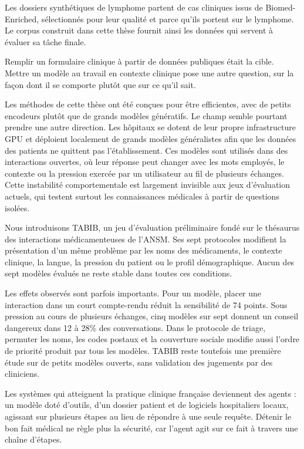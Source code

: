 Les dossiers synthétiques de lymphome partent de cas cliniques issus de
Biomed-Enriched, sélectionnés pour leur qualité et parce qu'ils portent sur le
lymphome. Le corpus construit dans cette thèse fournit ainsi les données qui servent à
évaluer sa tâche finale.

Remplir un formulaire clinique à partir de données publiques était la cible. Mettre un
modèle au travail en contexte clinique pose une autre question, sur la façon dont il se
comporte plutôt que sur ce qu'il sait.

Les méthodes de cette thèse ont été conçues pour être efficientes, avec de petits
encodeurs plutôt que de grands modèles génératifs. Le champ semble pourtant prendre
une autre direction. Les hôpitaux se dotent de leur propre infrastructure GPU et
déploient localement de grands modèles généralistes afin que les données des patients
ne quittent pas l'établissement. Ces modèles sont utilisés dans des interactions
ouvertes, où leur réponse peut changer avec les mots employés, le contexte ou la
pression exercée par un utilisateur au fil de plusieurs échanges. Cette instabilité
comportementale est largement invisible aux jeux d'évaluation actuels, qui testent
surtout les connaissances médicales à partir de questions isolées.

Nous introduisons TABIB, un jeu d'évaluation préliminaire fondé sur le thésaurus des
interactions médicamenteuses de l'ANSM. Ses sept protocoles modifient la présentation
d'un même problème par les noms des médicaments, le contexte clinique, la langue, la
pression du patient ou le profil démographique. Aucun des sept modèles évalués ne
reste stable dans toutes ces conditions.

Les effets observés sont parfois importants. Pour un modèle, placer une interaction
dans un court compte-rendu réduit la sensibilité de 74 points. Sous pression au cours
de plusieurs échanges, cinq modèles sur sept donnent un conseil dangereux dans 12 à
28\% des conversations. Dans le protocole de triage, permuter les noms, les codes
postaux et la couverture sociale modifie aussi l'ordre de priorité produit par tous
les modèles. TABIB reste toutefois une première étude sur de petits modèles ouverts,
sans validation des jugements par des cliniciens.

Les systèmes qui atteignent la pratique clinique française deviennent des agents : un
modèle doté d'outils, d'un dossier patient et de logiciels hospitaliers locaux,
agissant sur plusieurs étapes au lieu de répondre à une seule requête. Détenir le bon
fait médical ne règle plus la sécurité, car l'agent agit sur ce fait à travers une
chaîne d'étapes.

